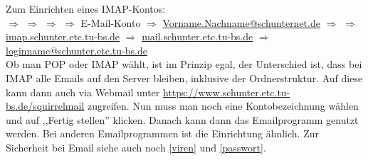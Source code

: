 Zum Einrichten eines IMAP-Kontos:\\
 $\Rightarrow$  $\Rightarrow$
 $\Rightarrow$  $\Rightarrow$
\mbox{E-Mail-Konto} $\Rightarrow$ 
\mbox{\url{Vorname.Nachname@schunternet.de}} $\Rightarrow$ 
$\Rightarrow$ 
\mbox{\url{imap.schunter.etc.tu-bs.de}}
$\Rightarrow$ 
\mbox{\url{mail.schunter.etc.tu-bs.de}} $\Rightarrow$ 
\mbox{\url{loginname@schunter.etc.tu-bs.de}}\\
 Ob man POP oder IMAP wählt, ist im Prinzip egal, der Unterschied ist,
dass bei IMAP alle Emails auf den Server bleiben, inklusive der
Ordnerstruktur. Auf diese kann dann auch via Webmail unter
\url{https://www.schunter.etc.tu-bs.de/squirrelmail} zugreifen. 
Nun muss man noch eine Kontobezeichnung wählen und auf ,,Fertig
stellen'' klicken. Danach kann dann das Emailprogramm genutzt werden.
Bei anderen Emailprogrammen ist die Einrichtung ähnlich. 
Zur Sicherheit bei Email siehe auch noch \ref{viren} und \ref{passwort}.





